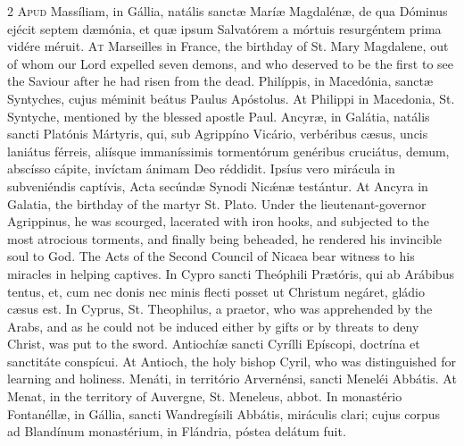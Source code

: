 \begin{paracol}{2}
\lettrine[lines=2]{A}{pud} Massíliam, in 
 Gállia, natális sanctæ Maríæ Magdalénæ, de qua Dóminus ejécit septem dæmónia, 
 et quæ ipsum Salvatórem a mórtuis resurgéntem prima vidére méruit.
\switchcolumn
{}
\lettrine[lines=2]{A}{t} Marseilles in France, the 
 birthday of St. Mary Magdalene, out of whom our Lord expelled seven demons, 
 and who deserved to be the first to see the Saviour after he had risen from 
 the dead.
\switchcolumn*
{}
Philíppis, in 
 Macedónia, sanctæ Syntyches, cujus méminit beátus Paulus Apóstolus.
\switchcolumn
{}
At Philippi in Macedonia, St. 
 Syntyche, mentioned by the blessed apostle Paul.
\switchcolumn*
{}
Ancyræ, in Galátia, natális sancti Platónis Mártyris, qui, sub Agrippíno Vicário, verbéribus 
 cæsus, uncis laniátus férreis, aliísque immaníssimis tormentórum genéribus 
 cruciátus, demum, abscísso cápite, invíctam ánimam Deo réddidit. 
 Ipsíus vero mirácula in subveniéndis captívis, Acta secúndæ Synodi Nicǽnæ 
 testántur.
\switchcolumn
{}
At Ancyra in Galatia, the birthday 
 of the martyr St. Plato. Under the lieutenant-governor Agrippinus, he 
 was scourged, lacerated with iron hooks, and subjected to the most atrocious 
 torments, and finally being beheaded, he rendered his invincible soul to 
 God. The Acts of the Second Council of Nicaea bear witness to his 
 miracles in helping captives.
\switchcolumn*
{}
In Cypro sancti 
 Theóphili Prætóris, qui ab Arábibus tentus, et, cum nec donis nec minis 
 flecti posset ut Christum negáret, gládio cæsus est.
\switchcolumn
{}
In Cyprus, St. Theophilus, a 
 praetor, who was apprehended by the Arabs, and as he could not be induced 
 either by gifts or by threats to deny Christ, was put to the sword.
\switchcolumn*
{}
Antiochíæ sancti 
 Cyrílli Epíscopi, doctrína et sanctitáte conspícui.
\switchcolumn
{}
At Antioch, the holy bishop Cyril, 
 who was distinguished for learning and holiness.
\switchcolumn*
{}
Menáti, in território 
 Arvernénsi, sancti Meneléi Abbátis.
\switchcolumn
{}
At Menat, in the territory of 
 Auvergne, St. Meneleus, abbot.
\switchcolumn*
{}
In monastério 
 Fontanéllæ, in Gállia, sancti Wandregísili Abbátis, miráculis clari; cujus 
 corpus ad Blandínum monastérium, in Flándria, póstea delátum fuit.
\switchcolumn
{}

\end{paracol}
